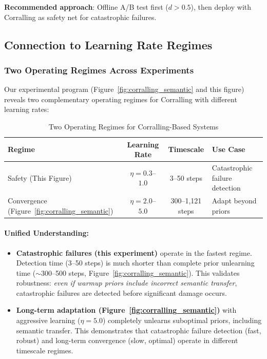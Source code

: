 \textbf{Recommended approach}: Offline A/B test first ($d > 0.5$), then deploy with Corralling as safety net for catastrophic failures.

\subsection{Connection to Learning Rate Regimes}

\subsubsection{Two Operating Regimes Across Experiments}

Our experimental program (Figure~\ref{fig:corralling_semantic} and this figure) reveals two complementary operating regimes for Corralling with different learning rates:

\begin{table}[h]
\centering
\caption{Two Operating Regimes for Corralling-Based Systems}
\begin{tabular}{lccl}
\toprule
\textbf{Regime} & \textbf{Learning Rate} & \textbf{Timescale} & \textbf{Use Case} \\
\midrule
Safety (This Figure) & $\eta=0.3$--$1.0$ & 3--50 steps & Catastrophic failure detection \\
Convergence (Figure~\ref{fig:corralling_semantic}) & $\eta=2.0$--$5.0$ & 300--1,121 steps & Adapt beyond priors \\
\bottomrule
\end{tabular}
\end{table}

\paragraph{Unified Understanding:}
\begin{itemize}
    \item \textbf{Catastrophic failures (this experiment)} operate in the fastest regime. Detection time (3--50 steps) is much shorter than complete prior unlearning time ($\sim$300--500 steps, Figure~\ref{fig:corralling_semantic}). This validates robustness: \emph{even if warmup priors include incorrect semantic transfer}, catastrophic failures are detected before significant damage occurs.
    
    \item \textbf{Long-term adaptation (Figure~\ref{fig:corralling_semantic})} with aggressive learning ($\eta=5.0$) completely unlearns suboptimal priors, including semantic transfer. This demonstrates that catastrophic failure detection (fast, robust) and long-term convergence (slow, optimal) operate in different timescale regimes.
\end{itemize}

